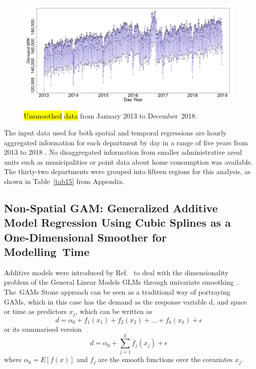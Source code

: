 \documentclass[energies,article,accept,pdftex,moreauthors]{Definitions/mdpi}
\begin{document}
    \begin{figure}[H]
		\includegraphics[height=6cm, width=14cm]{figs/timeseriesdemand.png}
	\caption{\hl{Unsmoothed} %
 \hl{data} %
 from January 2013 to December~2018. \label{fig:3}}
    \end{figure}

The input data used for both spatial and temporal regressions are hourly aggregated information for each department by day in a range of five years from 2013 to 2018 . No disaggregated information from smaller administrative areal units such as municipalities or point data about home consumption was available. The thirty-two departments were grouped into fifteen regions for this analysis, as shown in Table~\ref{tab15} from Appendix.

     \subsection{Non-Spatial GAM: Generalized Additive Model Regression Using Cubic Splines as a One-Dimensional Smoother for Modelling~Time} 
     
     Additive models were introduced by Ref.~\citep{Stone1986TheModels} to deal with the dimensionality problem of the General Linear Models GLMs through univariate smoothing~\citep{Nisbet2018BasicOverview}. The~GAMs Stone approach can be seen as a  traditional way of portraying GAMs, which in this case has the demand as the response variable d, and space or time as predictors $x_j$, which can be written as
\begin{equation}
        d=\alpha_{0}+f_1(x_1)+f_2(x_2)+...+f_k(x_k)+\epsilon
     \end{equation}
or its summarised version
\begin{equation}
         d=\alpha_{0}+\sum_{j=1}^{k}f_j(x_j)+\epsilon
     \end{equation}
where \(\alpha_{0}=E[f(x)]\) and $f_j$ are the smooth functions over the covariates $x_j$.
     
\end{document}
